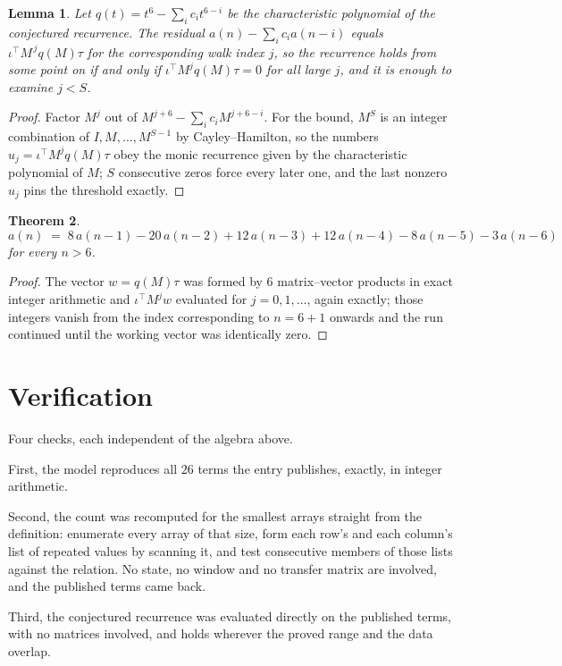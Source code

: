 \documentclass[11pt,a4paper]{article}
\theoremstyle{plain}
\newtheorem{theorem}{Theorem}
\newtheorem{lemma}[theorem]{Lemma}
\theoremstyle{definition}
\begin{document}
\begin{lemma}\label{lem:crit}
Let $q(t)=t^{6}-\sum_i c_it^{6-i}$ be the characteristic polynomial of the
conjectured recurrence. The residual $a(n)-\sum_ic_ia(n-i)$ equals
$\iota^{\!\top}M^{\,j}q(M)\tau$ for the corresponding walk index $j$, so the recurrence
holds from some point on if and only if $\iota^{\!\top}M^{j}q(M)\tau=0$ for all large $j$,
and it is enough to examine $j<S$.
\end{lemma}

\begin{proof}
Factor $M^{j}$ out of $M^{j+6}-\sum_ic_iM^{j+6-i}$. For the bound, $M^{S}$
is an integer combination of $I,M,\dots,M^{S-1}$ by Cayley--Hamilton, so the numbers
$u_j=\iota^{\!\top}M^{j}q(M)\tau$ obey the monic recurrence given by the characteristic
polynomial of $M$; $S$ consecutive zeros force every later one, and the last nonzero $u_j$
pins the threshold exactly.
\end{proof}

\begin{theorem}
\[
a(n)\;=\;8\,a(n-1) - 20\,a(n-2) + 12\,a(n-3) + 12\,a(n-4) - 8\,a(n-5) - 3\,a(n-6)
\]
for every $n>6$.
\end{theorem}

\begin{proof}
The vector $w=q(M)\tau$ was formed by $6$ matrix--vector products in exact integer
arithmetic and $\iota^{\!\top}M^{j}w$ evaluated for $j=0,1,\dots$, again exactly; those
integers vanish from the index corresponding to $n=6+1$ onwards and the run continued
until the working vector was identically zero.
\end{proof}

\section{Verification}

Four checks, each independent of the algebra above.

First, the model reproduces all $26$ terms the entry publishes, exactly, in integer
arithmetic.

Second, the count was recomputed for the smallest arrays straight from the definition:
enumerate every array of that size, form each row's and each column's list of repeated values
by scanning it, and test consecutive members of those lists against the relation. No state, no
window and no transfer matrix are involved, and the published terms came back.

Third, the conjectured recurrence was evaluated directly on the published terms, with no
matrices involved, and holds wherever the proved range and the data overlap.
\end{document}
